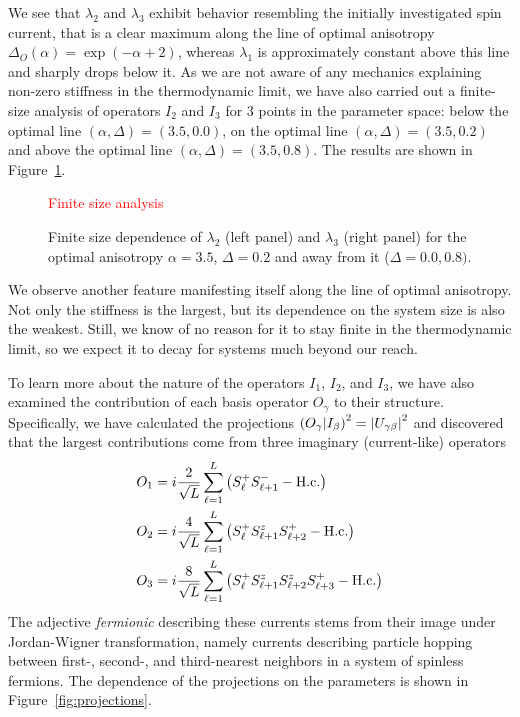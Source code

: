 We see that \(\lambda_2\) and \(\lambda_3\) exhibit behavior resembling the initially investigated spin current,
that is a clear maximum along the line of optimal anisotropy \(\Delta_{O}(\alpha) = \exp(-\alpha + 2)\),
whereas \(\lambda_1\) is approximately constant above this line and sharply drops below it.
As we are not aware of any mechanics explaining non-zero stiffness in the thermodynamic limit, we
have also carried out a finite-size analysis of operators \(I_2\) and \(I_3\) for 3 points in the parameter space:
below the optimal line \((\alpha,\Delta) = (3.5,0.0)\), on the optimal line \((\alpha,\Delta) = (3.5,0.2)\) and
above the optimal line \((\alpha,\Delta) = (3.5,0.8)\). The results are shown in Figure~\ref{fig:stiffness_finite_size}.


\begin{figure}[htbp]
  \centering
  \textcolor{red}{Finite size analysis}
  \caption{Finite size dependence of \(\lambda_2\) (left panel) and \(\lambda_3\) (right panel) for the
  optimal anisotropy \(\alpha = 3.5\), \(\Delta = 0.2\) and away from it (\(\Delta = 0.0,0.8)\).}
  \label{fig:stiffness_finite_size}
\end{figure}
We observe another feature manifesting itself along the line of optimal anisotropy. Not only
the stiffness is the largest, but its dependence on the system size is also the weakest. Still,
we know of no reason for it to stay finite in the thermodynamic limit, so we expect it to
decay for systems much beyond our reach.

To learn more about the nature of the operators \(I_1\), \(I_2\), and \(I_3\), we have also
examined the contribution of each basis operator \(O_{\gamma}\) to their structure. Specifically,
we have calculated the projections \(\left(O_{\gamma} \middle| I_{\beta}\right)^2 = \abs{U_{\gamma\beta}}^2\)
and discovered that the largest contributions come from three imaginary (current-like) operators
\begin{align}
  O_1 &= i \frac{2}{\sqrt{L}} \sum_{\ell=1}^L \left(S^{+}_{\ell} S^{-}_{\ell+1} - \textrm{H.c.}\right)\nonumber\\
  O_2 &= i \frac{4}{\sqrt{L}} \sum_{\ell=1}^L \left(S^{+}_{\ell} S^{z}_{\ell+1} S^{+}_{\ell+2} - \textrm{H.c.}\right)\nonumber\\
  O_3 &= i \frac{8}{\sqrt{L}} \sum_{\ell=1}^L \left(S^{+}_{\ell} S^{z}_{\ell+1} S^{z}_{\ell+2} S^{+}_{\ell+3} - \textrm{H.c.}\right)
  \label{eq:fermionic_currents}
\end{align}
The adjective \textit{fermionic} describing these currents stems from their image under Jordan-Wigner transformation,
namely currents describing particle hopping between first-, second-, and third-nearest neighbors in a system
of spinless fermions.
The dependence of the projections on the parameters is shown in Figure~\ref{fig:projections}.

